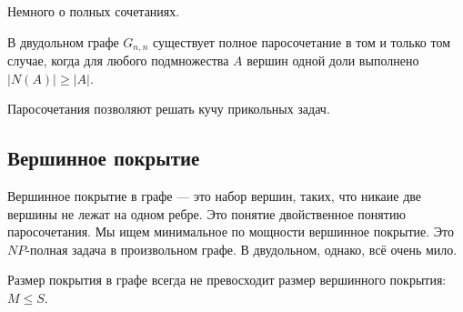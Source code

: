 Немного о полных сочетаниях.
\begin{theorem}
В двудольном графе $G_{n,n}$ существует полное паросочетание в том и только том случае, когда для любого подмножества $A$ вершин одной доли выполнено $|N(A)| \geqslant |A|$. 
\end{theorem}

Паросочетания позволяют решать кучу прикольных задач.

\subsection{Вершинное покрытие}
Вершинное покрытие в графе --- это набор вершин, таких, что никаие две вершины не лежат на одном ребре.
Это понятие двойственное понятию паросочетания.
Мы ищем минимальное по мощности вершинное покрытие. 
Это $NP$-полная задача в произвольном графе.
В двудольном, однако, всё очень мило.

Размер покрытия в графе всегда не превосходит размер вершинного покрытия: $M \leqslant S$.

